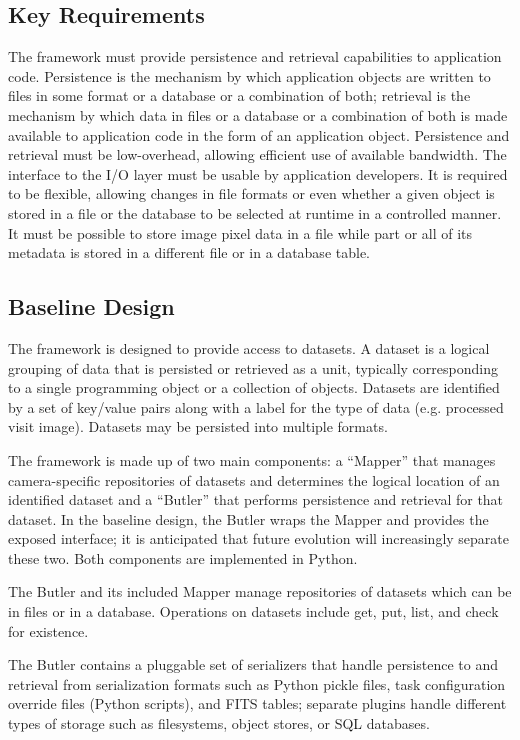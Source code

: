 \documentclass[DM,lsstdraft,toc]{lsstdoc}
\begin{document}
\subsection{Key Requirements}\label{butler-requirements}

The framework must provide persistence and retrieval capabilities to
application code. Persistence is the mechanism by which application
objects are written to files in some format or a database or a
combination of both; retrieval is the mechanism by which data in files
or a database or a combination of both is made available to application
code in the form of an application object. Persistence and retrieval
must be low-overhead, allowing efficient use of available bandwidth. The
interface to the I/O layer must be usable by application developers. It
is required to be flexible, allowing changes in file formats or even
whether a given object is stored in a file or the database to be
selected at runtime in a controlled manner. It must be possible to store
image pixel data in a file while part or all of its metadata is stored
in a different file or in a database table.

\subsection{Baseline Design}\label{butler-design}

The framework is designed to provide access to datasets. A dataset is a logical
grouping of data that is persisted or retrieved as a unit, typically
corresponding to a single programming object or a collection of objects.
Datasets are identified by a set of key/value pairs along with a label for the
type of data (e.g. processed visit image).  Datasets may be persisted into
multiple formats.

The framework is made up of two main components: a ``Mapper'' that manages
camera-specific repositories of datasets and determines the
logical location of an identified dataset and a ``Butler'' that performs
persistence and retrieval for that dataset.  In the baseline design, the Butler
wraps the Mapper and provides the exposed interface; it is anticipated that
future evolution will increasingly separate these two.  Both components are
implemented in Python.

The Butler and its included Mapper manage repositories
of datasets which can be in files or in a database.
Operations on datasets include get, put, list, and check for existence.

The Butler contains a pluggable set of serializers that handle persistence to
and retrieval from serialization formats such as Python pickle files, task
configuration override files (Python scripts), and FITS tables; separate
plugins handle different types of storage such as filesystems, object stores,
or SQL databases.
\end{document}
